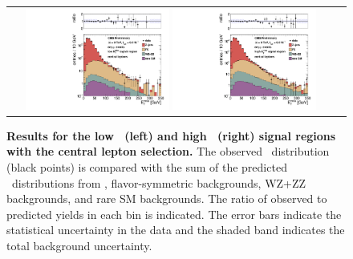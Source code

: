 \begin{figure}[!h]
\begin{center}
\begin{tabular}{cc}
\includegraphics[width=0.45\textwidth]{plots/edge_pfmet_pt40_lowMet_central_all.pdf}
\includegraphics[width=0.45\textwidth]{plots/edge_pfmet_pt40_highMet_central_all.pdf}
\end{tabular}
\caption{\footnotesize {\bf Results for the low \MET\ (left) and high \MET\ (right) signal regions with the central lepton selection.}
The observed \MET\ distribution (black points) is compared with the sum of the predicted \MET\
distributions from \zjets, flavor-symmetric backgrounds, WZ+ZZ backgrounds, and rare SM backgrounds. 
The ratio of observed to predicted yields in each bin is
indicated. The error bars indicate the statistical uncertainty in the data and the shaded band indicates the total background uncertainty.
\label{fig:results_central}
}
\end{center}
\end{figure}

